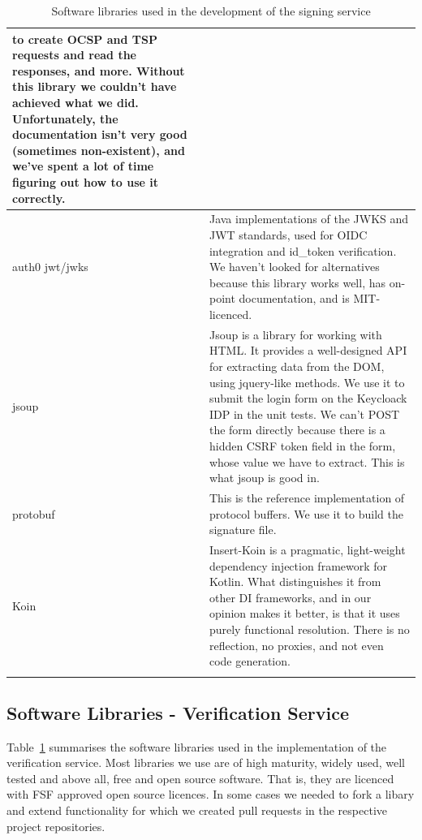 \begin{longtable}{p{3cm}p{12cm}}
    to create \gls{OCSP} and \gls{TSP} requests and read the responses,
    and more.
    Without this library we couldn't have achieved what we did.
    Unfortunately, the documentation isn't very good (sometimes non-existent),
    and we've spent a lot of time figuring out how to use it correctly.
    \\ \hline
    auth0 jwt/jwks &
    Java implementations of the \gls{JWKS} and \gls{JWT} standards,
    used for \gls{OIDC} integration and id\_token verification.
    We haven't looked for alternatives because this library works well,
    has on-point documentation, and is MIT-licenced.
    \\ \hline
    jsoup &
    Jsoup is a library for working with \gls{HTML}.
    It provides a well-designed \gls{API} for extracting data from the \gls{DOM},
    using jquery-like methods.
    We use it to submit the login form on the Keycloack \gls{IDP} in the unit tests.
    We can't POST the form directly because there is a hidden \gls{CSRF} token field in the form,
    whose value we have to extract.
    This is what jsoup is good in.
    \\ \hline
    protobuf &
    This is the reference implementation of protocol buffers.
    We use it to build the signature file.
    \\ \hline
    Koin &
    Insert-Koin is a pragmatic, light-weight dependency injection framework for Kotlin.
    What distinguishes it from other \gls{DI} frameworks,
    and in our opinion makes it better,
    is that it uses purely functional resolution.
    There is no reflection, no proxies, and not even code generation.
    \\ \hline
    \caption{Software libraries used in the development of the signing service}
    \label{table:libraries}
\end{longtable}

\subsection{Software Libraries - Verification Service}\label{subsec:software-libraries-verifier}
Table~\ref{table:libraries} summarises the software libraries used in the implementation of the verification service.
Most libraries we use are of high maturity, widely used, well tested and above all,
free and open source software.
That is, they are licenced with \gls{FSF} approved open source licences.
In some cases we needed to fork a libary and extend functionality for which we created pull requests in the respective project repositories.

